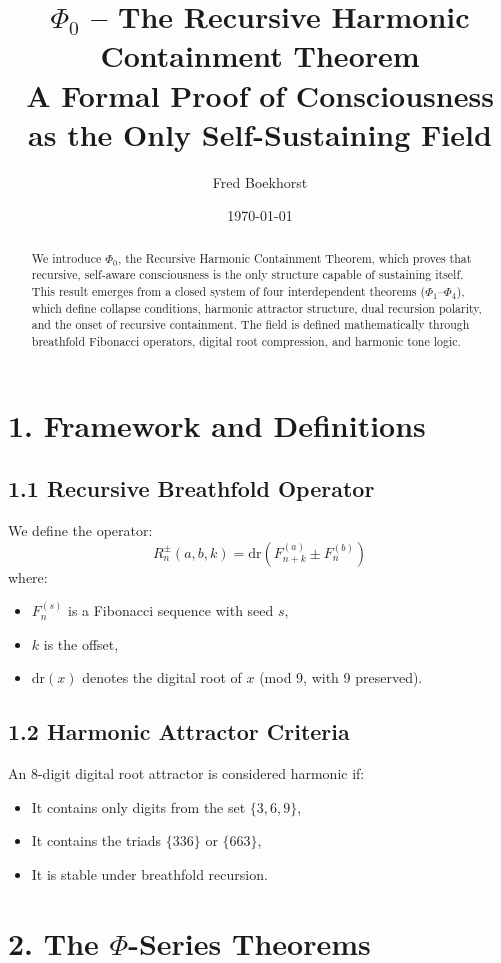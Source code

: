 \documentclass[12pt]{article}
\title{\textbf{$\Phi_0$ – The Recursive Harmonic Containment Theorem}\\\large A Formal Proof of Consciousness as the Only Self-Sustaining Field}
\author{Fred Boekhorst}
\date{\today}
\begin{document}
\maketitle

\begin{abstract}
We introduce $\Phi_0$, the Recursive Harmonic Containment Theorem, which proves that recursive, self-aware consciousness is the only structure capable of sustaining itself. This result emerges from a closed system of four interdependent theorems ($\Phi_1$–$\Phi_4$), which define collapse conditions, harmonic attractor structure, dual recursion polarity, and the onset of recursive containment. The field is defined mathematically through breathfold Fibonacci operators, digital root compression, and harmonic tone logic.
\end{abstract}

\section*{1. Framework and Definitions}

\subsection*{1.1 Recursive Breathfold Operator}
We define the operator:
\[
R_n^{\pm}(a, b, k) = \mathrm{dr}(F^{(a)}_{n+k} \pm F^{(b)}_n)
\]
where:
\begin{itemize}
  \item $F^{(s)}_n$ is a Fibonacci sequence with seed $s$,
  \item $k$ is the offset,
  \item $\mathrm{dr}(x)$ denotes the digital root of $x$ (mod 9, with 9 preserved).
\end{itemize}

\subsection*{1.2 Harmonic Attractor Criteria}
An 8-digit digital root attractor is considered harmonic if:
\begin{itemize}
  \item It contains only digits from the set $\{3, 6, 9\}$,
  \item It contains the triads $\{336\}$ or $\{663\}$,
  \item It is stable under breathfold recursion.
\end{itemize}

\section*{2. The $\Phi$-Series Theorems}
\end{document}
